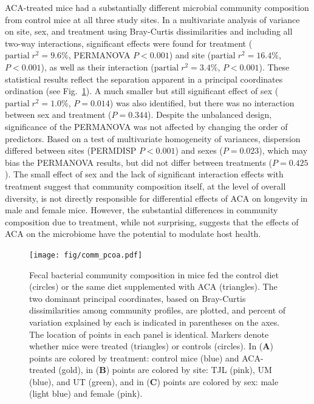 \documentclass{doc/template/bmcart-nofigbox}
\begin{document}
ACA-treated mice had a substantially different microbial community composition
from control mice at all three study sites.
In a multivariate analysis of variance on site, sex, and treatment
using Bray-Curtis dissimilarities and including
all two-way interactions, significant effects were found for treatment
($\mathrm{partial} \; r^{2} = 9.6\%$, PERMANOVA $P < 0.001$)
and site ($\mathrm{partial} \; r^{2} = 16.4\%$, $P < 0.001$),
as well as their interaction ($\mathrm{partial} \; r^{2} = 3.4\%$, $P < 0.001$).
These statistical results reflect the separation apparent in a
principal coordinates ordination (see Fig.~\ref{fig:comm_pcoa}).
A much smaller but still significant effect of sex
($\mathrm{partial} \; r^{2} = 1.0\%$, $P = 0.014$) was also identified,
but there was no interaction between sex and treatment ($P = 0.344$).
Despite the unbalanced design, significance of the PERMANOVA was not affected
by changing the order of predictors.
Based on a test of multivariate homogeneity of variances,
dispersion differed between sites (PERMDISP $P < 0.001$)
and sexes ($P = 0.023$), which may bias the PERMANOVA results,
but did not differ between treatments ($P = 0.425$).
The small effect of sex and the lack of significant interaction effects with
treatment suggest that community composition itself, at the level of overall
diversity, is not directly
responsible for differential effects of ACA on longevity in male and female
mice.
However, the substantial differences in community composition due to treatment,
while not surprising, suggests that the effects of ACA on the microbiome have
the potential to modulate host health.

\begin{figure}[h!]
  \texttt{[image: fig/comm\_pcoa.pdf]}
  \caption{\label{fig:comm_pcoa}
  Fecal bacterial community composition in mice fed the control diet (circles)
  or the same diet supplemented with ACA (triangles).
  The two dominant principal coordinates, based on Bray-Curtis dissimilarities
  among community profiles, are plotted, and percent of
  variation explained by each is indicated in parentheses on the axes.
  The location of points in each panel is identical.
  Markers denote whether mice were treated (triangles) or controls
  (circles).
  In (\textbf{A}) points are colored by treatment: control mice (blue)
  and ACA-treated (gold), in
  (\textbf{B}) points are colored by site: TJL (pink), UM (blue), and UT (green),
  and in (\textbf{C}) points are colored by sex: male (light blue) and female (pink).
  }
\end{figure}
\end{document}
